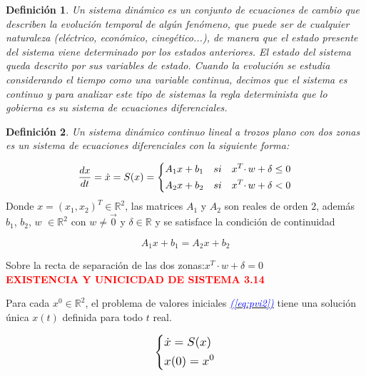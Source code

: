 \documentclass[12pt,a4paper]{report} %
\newtheorem{definicion}{Definición} %
\newcommand{\eref}[1]{\hyperref[#1]{\textcolor{blue}{\textit{(\ref*{#1})}}}}
\begin{document}
	\begin{definicion}
		Un sistema dinámico es un conjunto de ecuaciones de cambio que describen la evolución temporal de algún fenómeno, que puede ser de cualquier naturaleza (eléctrico, económico, cinegético...), de manera que el estado presente del sistema viene determinado por los estados anteriores. El estado del sistema queda descrito por sus variables de estado. Cuando la evolución se estudia considerando el tiempo como una variable 
		continua, decimos que el sistema es continuo y para analizar este tipo de sistemas la regla determinista que lo gobierna es su sistema de ecuaciones diferenciales.
	\end{definicion}
	
	\begin{definicion}
		Un sistema dinámico continuo lineal a trozos plano con dos zonas es un sistema de ecuaciones diferenciales con la siguiente forma:
	\end{definicion}
	
	\begin{equation}
		\frac{dx}{dt}=\dot{x}=S(x)=
		\label{eq:biz1}
		\scalebox{1}{$\displaystyle
			\left\{
			\begin{aligned}
			 A_1x+b_1\quad si \quad x^T\cdotp w+\delta \leq 0 \\
			 A_2x+b_2\quad si \quad x^T\cdotp w+\delta < 0
			\end{aligned}
			\right.
			$}
	\end{equation}\smallskip
	Donde $x=(x_1,x_2)^T\in \mathbb{R}^2$, las matrices $A_1$ y $A_2$ son reales de orden $2$, además\\ $b_1$, $b_2$, $w$ $\in \mathbb{R}^2$ con $w\neq\vec{0}$ y $\delta \in \mathbb{R}$ y se satisface la condición de continuidad
	
	\begin{equation}
		A_1x+b_1=A_2x+b_2 
	\end{equation}\smallskip
	
	Sobre la recta de separación de las dos zonas:\quad $x^T\cdotp w+\delta = 0$ \\[0.5cm]
	
	\textbf{\textcolor{red}{EXISTENCIA Y UNICICDAD DE SISTEMA 3.14}}

	Para cada $x^0 \in \mathbb{R}^2$, el problema de valores iniciales \eref{eq:pvi2} tiene una solución única $x(t)$ definida para todo $t$ real.
	
	\begin{equation}
		\label{eq:pvi2}
		\scalebox{1.2}{$\displaystyle
			\left\{
			\begin{aligned}
				&\dot{x}=S(x)\\
				&x(0)=x^0
			\end{aligned}
			\right.
			$}
	\end{equation}\smallskip
	
\end{document}
